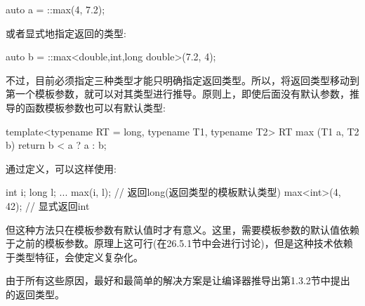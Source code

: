 \begin{cpp}
auto a = ::max(4, 7.2);
\end{cpp}

或者显式地指定返回的类型:

\begin{cpp}
auto b = ::max<double,int,long double>(7.2, 4);
\end{cpp}

不过，目前必须指定三种类型才能只明确指定返回类型。所以，将返回类型移动到第一个模板参数，就可以对其类型进行推导。原则上，即使后面没有默认参数，推导的函数模板参数也可以有默认类型:

\begin{cpp}
template<typename RT = long, typename T1, typename T2>
RT max (T1 a, T2 b)
{
	return b < a ? a : b;
}
\end{cpp}

通过定义，可以这样使用:

\begin{cpp}
int i;
long l;
...
max(i, l); // 返回long(返回类型的模板默认类型)
max<int>(4, 42); // 显式返回int
\end{cpp}

但这种方法只在模板参数有默认值时才有意义。这里，需要模板参数的默认值依赖于之前的模板参数。原理上这可行(在26.5.1节中会进行讨论)，但是这种技术依赖于类型特征，会使定义复杂化。

由于所有这些原因，最好和最简单的解决方案是让编译器推导出第1.3.2节中提出的返回类型。
